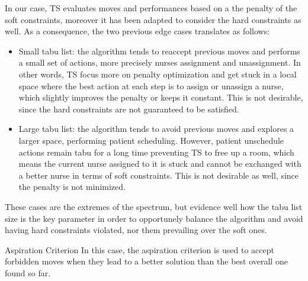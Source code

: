 \begin{section}
\begin{subsection}
     In our case, TS evaluates moves and performances based on a
     the penalty of the soft constraints, moreover it has been adapted to consider
     the hard constraints as well. As a consequence,
     the two previous edge cases translates as follows:
     \begin{itemize}
         \item Small tabu list: the algorithm tends to reaccept previous moves and
               performs a small set of actions, more precisely nurses assignment and unassignment.
               In other words, TS focus more on penalty optimization and get stuck in a local space where
               the best action at each step is to assign or unassign a nurse, which slightly improves the penalty
               or keeps it constant. This is not desirable, since the hard constraints are not guaranteed to be satisfied.
         \item Large tabu list: the algorithm tends to avoid previous moves and explores a larger space,
               performing patient scheduling. However, patient unschedule
               actions remain tabu for a long time preventing TS to free up a room, which means
               the current nurse assigned to it is stuck and cannot be exchanged with a
               better nurse in terms of soft constraints.
               This is not desirable as well, since the penalty is not minimized.

     \end{itemize}
     These cases are the extremes of the spectrum,
     but evidence well how the tabu list size is the key parameter in order to
     opportunely balance the algorithm and avoid having
     hard constraints violated, nor them prevailing over the soft ones.


 \end{subsection}

 \begin{subsection}
     {Aspiration Criterion}
     In this case, the aspiration criterion is used to accept forbidden moves when they lead to
     a better solution than the best overall one found so far.


 \end{subsection}
\end{section}